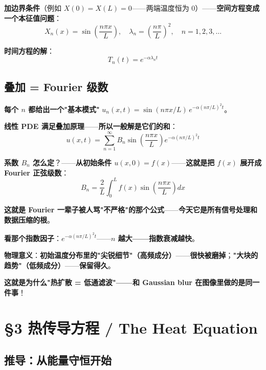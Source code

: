 \textbf{加边界条件}（例如 $X(0) = X(L) = 0$——两端温度恒为 0）——\textbf{空间方程变成一个本征值问题}：
\[
X_n(x) = \sin\!\left(\frac{n\pi x}{L}\right), \quad \lambda_n = \left(\frac{n\pi}{L}\right)^2, \quad n = 1, 2, 3, \dots
\]

\textbf{时间方程的解}：
\[
T_n(t) = e^{-\alpha \lambda_n t}
\]

\subsection{叠加 = Fourier 级数}

\textbf{每个 $n$ 都给出一个"基本模式"} $u_n(x,t) = \sin(n\pi x/L) \, e^{-\alpha(n\pi/L)^2 t}$。

\textbf{线性 PDE 满足叠加原理}——\textbf{所以一般解是它们的和}：
\begin{equation}
u(x, t) = \sum_{n=1}^{\infty} B_n \sin\!\left(\frac{n\pi x}{L}\right) e^{-\alpha (n\pi/L)^2 t}
\end{equation}

\textbf{系数 $B_n$ 怎么定}？——\textbf{从初始条件 $u(x, 0) = f(x)$}——\textbf{这就是\textbf{把 $f(x)$ 展开成 Fourier 正弦级数}}：
\begin{equation}
B_n = \frac{2}{L} \int_0^L f(x) \sin\!\left(\frac{n\pi x}{L}\right) dx
\end{equation}

\textbf{这就是 Fourier 一辈子被人骂"不严格"的那个公式}——\textbf{今天它是所有信号处理和数据压缩的根}。

\begin{example}
\textbf{看那个指数因子}：\textbf{$e^{-\alpha (n\pi/L)^2 t}$}——\textbf{$n$ 越大——指数衰减越快}。

\textbf{物理意义}：\textbf{初始温度分布里的"尖锐细节"（高频成分）}——\textbf{很快被磨掉}；\textbf{"大块的趋势"（低频成分）}——\textbf{保留得久}。

\textbf{这就是为什么"热扩散 = 低通滤波"——和 Gaussian blur 在图像里做的是同一件事}！
\end{example}

\section{§3 热传导方程 / The Heat Equation}

\subsection{推导：从能量守恒开始}


